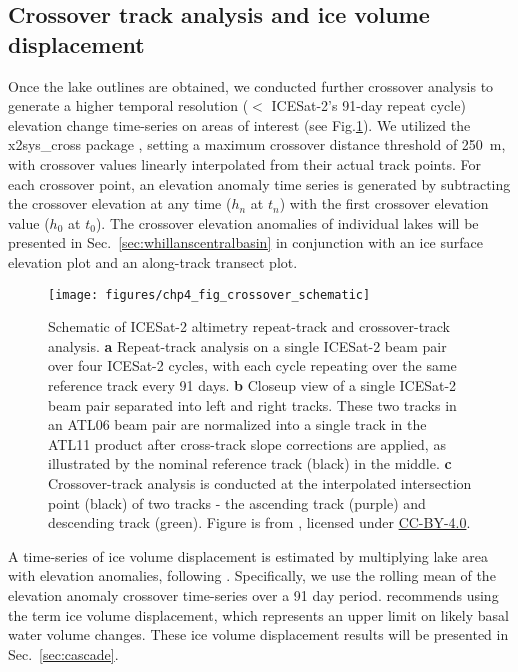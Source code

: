 \subsection{Crossover track analysis and ice volume displacement} \label{sec:crossover_displacement}

Once the lake outlines are obtained, we conducted further crossover analysis to generate a higher temporal resolution ($<$ ICESat-2's 91-day repeat cycle) elevation change time-series on areas of interest (see Fig.\ref{fig:crossover_schematic}).
We utilized the x2sys\_cross package \citep{WesselToolsanalyzingintersecting2010}, setting a maximum crossover distance threshold of \SI{250}{\metre}, with crossover values linearly interpolated from their actual track points.
For each crossover point, an elevation anomaly time series is generated by subtracting the crossover elevation at any time ($h_n$ at $t_n$) with the first crossover elevation value ($h_0$ at $t_0$).
The crossover elevation anomalies of individual lakes will be presented in Sec.~\ref{sec:whillanscentralbasin} in conjunction with an ice surface elevation plot and an along-track transect plot.

\begin{figure}[htbp]
  \centering
  \texttt{[image: figures/chp4\_fig\_crossover\_schematic]}
  \caption[Schematic of ICESat-2 altimetry repeat-track and crossover-track analysis]{
    Schematic of ICESat-2 altimetry repeat-track and crossover-track analysis.
    \textbf{a} Repeat-track analysis on a single ICESat-2 beam pair over four ICESat-2 cycles, with each cycle repeating over the same reference track every 91 days.
    \textbf{b} Closeup view of a single ICESat-2 beam pair separated into left and right tracks.
    These two tracks in an ATL06 beam pair are normalized into a single track in the ATL11 product after cross-track slope corrections are applied, as illustrated by the nominal reference track (black) in the middle.
    \textbf{c} Crossover-track analysis is conducted at the interpolated intersection point (black) of two tracks - the ascending track (purple) and descending track (green).
    Figure is from \citet{LiMappinggroundingzone2020}, licensed under \href{https://creativecommons.org/licenses/by/4.0}{CC-BY-4.0}.
  }
  \label{fig:crossover_schematic}
\end{figure}

A time-series of ice volume displacement is estimated by multiplying lake area with elevation anomalies, following \citet{SiegfriedEpisodicicevelocity2016,KimActivesubglaciallakes2016}.
Specifically, we use the rolling mean of the elevation anomaly crossover time-series over a 91 day period. %
\citet{SiegfriedEpisodicicevelocity2016} recommends using the term ice volume displacement, which represents an upper limit on likely basal water volume changes.
These ice volume displacement results will be presented in Sec.~\ref{sec:cascade}.

